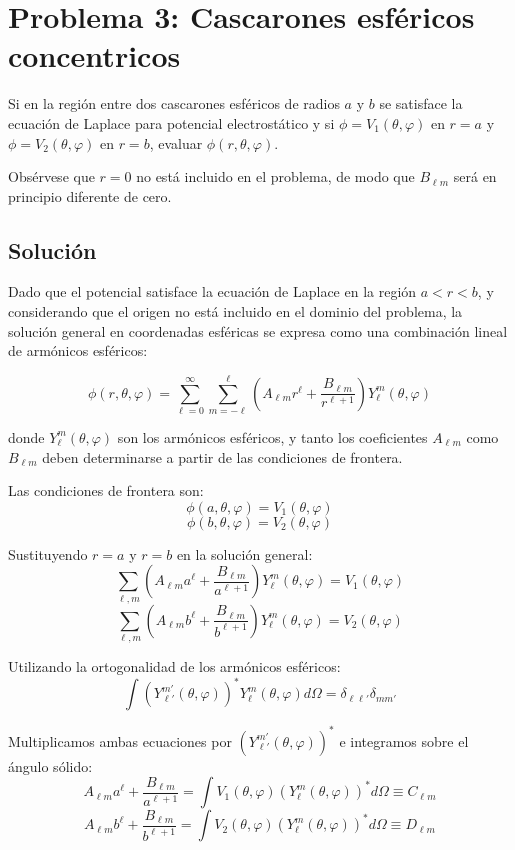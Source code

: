 \documentclass[a4paper]{article}
\begin{document}
\section{Problema 3: Cascarones esféricos concentricos}

Si en la región entre dos cascarones esféricos de radios $a$ y $b$ se satisface la ecuación de Laplace para potencial electrostático y si $\phi = V_1(\theta, \varphi)$ en $r = a$ y $\phi = V_2(\theta, \varphi)$ en $r = b$, evaluar $\phi(r, \theta, \varphi)$.

Obsérvese que $r = 0$ no está incluido en el problema, de modo que $B_{\ell m}$ será en principio diferente de cero.

\subsection{Solución}

Dado que el potencial satisface la ecuación de Laplace en la región $a < r < b$, y considerando que el origen no está incluido en el dominio del problema, la solución general en coordenadas esféricas se expresa como una combinación lineal de armónicos esféricos:

$$
\phi(r,\theta,\varphi) = \sum_{\ell=0}^{\infty} \sum_{m=-\ell}^{\ell} \left( A_{\ell m} r^\ell + \frac{B_{\ell m}}{r^{\ell+1}} \right) Y_\ell^m(\theta,\varphi)
$$

donde $Y_\ell^m(\theta,\varphi)$ son los armónicos esféricos, y tanto los coeficientes $A_{\ell m}$ como $B_{\ell m}$ deben determinarse a partir de las condiciones de frontera.

Las condiciones de frontera son:
$$
\phi(a,\theta,\varphi) = V_1(\theta,\varphi)
$$
$$
\phi(b,\theta,\varphi) = V_2(\theta,\varphi)
$$

Sustituyendo $r=a$ y $r=b$ en la solución general:
$$
\sum_{\ell,m} \left( A_{\ell m} a^\ell + \frac{B_{\ell m}}{a^{\ell+1}} \right) Y_\ell^m(\theta,\varphi) = V_1(\theta,\varphi)
$$
$$
\sum_{\ell,m} \left( A_{\ell m} b^\ell + \frac{B_{\ell m}}{b^{\ell+1}} \right) Y_\ell^m(\theta,\varphi) = V_2(\theta,\varphi)
$$

Utilizando la ortogonalidad de los armónicos esféricos:
$$
\int \left(Y_{\ell'}^{m'}(\theta,\varphi)\right)^* Y_\ell^m(\theta,\varphi) d\Omega = \delta_{\ell\ell'}\delta_{mm'}
$$

Multiplicamos ambas ecuaciones por $\left(Y_{\ell'}^{m'}(\theta,\varphi)\right)^*$ e integramos sobre el ángulo sólido:
$$
A_{\ell m} a^\ell + \frac{B_{\ell m}}{a^{\ell+1}} = \int V_1(\theta,\varphi) \left(Y_\ell^m(\theta,\varphi)\right)^* d\Omega \equiv C_{\ell m}
$$
$$
A_{\ell m} b^\ell + \frac{B_{\ell m}}{b^{\ell+1}} = \int V_2(\theta,\varphi) \left(Y_\ell^m(\theta,\varphi)\right)^* d\Omega \equiv D_{\ell m}
$$
\end{document}
